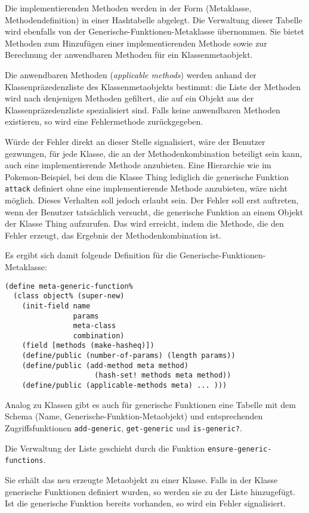 Die implementierenden Methoden werden in der Form (Metaklasse, Methodendefinition) in einer Hashtabelle abgelegt. Die Verwaltung dieser Tabelle wird ebenfalls von der Generische-Funktionen-Metaklasse übernommen. Sie bietet Methoden zum Hinzufügen einer implementierenden Methode sowie zur Berechnung der anwendbaren Methoden für ein Klassenmetaobjekt.

Die anwendbaren Methoden (\emph{applicable methods}) werden anhand der Klassenpräzedenzliste des Klassenmetaobjekts bestimmt: die Liste der Methoden wird nach denjenigen Methoden gefiltert, die auf ein Objekt aus der Klassenpräzedenzliste spezialisiert sind. Falls keine anwendbaren Methoden existieren, so wird eine Fehlermethode zurückgegeben. 

Würde der Fehler direkt an dieser Stelle signalisiert, wäre der Benutzer gezwungen, für jede Klasse, die an der Methodenkombination beteiligt sein kann, auch eine implementierende Methode anzubieten. Eine Hierarchie wie im Pokemon-Beispiel, bei dem die Klasse Thing lediglich die generische Funktion \texttt{attack} definiert ohne eine implementierende Methode anzubieten, wäre nicht möglich. Dieses Verhalten soll jedoch erlaubt sein. Der Fehler soll erst auftreten, wenn der Benutzer tatsächlich versucht, die generische Funktion an einem Objekt der Klasse Thing aufzurufen. Das wird erreicht, indem die Methode, die den Fehler erzeugt, das Ergebnis der Methodenkombination ist.

Es ergibt sich damit folgende Definition für die Generische-Funktionen-Metaklasse:

\begin{lstlisting}
(define meta-generic-function%
  (class object% (super-new)
    (init-field name
                params
                meta-class
                combination) 
    (field [methods (make-hasheq)]) 
    (define/public (number-of-params) (length params))
    (define/public (add-method meta method) 
                     (hash-set! methods meta method))
    (define/public (applicable-methods meta) ... )))
\end{lstlisting}

Analog zu Klassen gibt es auch für generische Funktionen eine Tabelle mit dem Schema (Name, Generische-Funktion-Metaobjekt) und entsprechenden Zugriffsfunktionen \texttt{add-generic}, \texttt{get-generic} und \texttt{is-generic?}.

Die Verwaltung der Liste geschieht durch die Funktion \texttt{ensure-generic-functions}. 

Sie erhält das neu erzeugte Metaobjekt zu einer Klasse. Falls in der Klasse generische Funktionen definiert wurden, so werden sie zu der Liste hinzugefügt. Ist die generische Funktion bereits vorhanden, so wird ein Fehler signalisiert.

